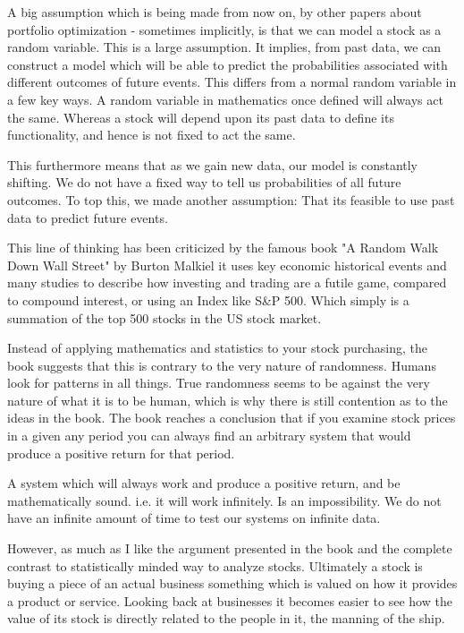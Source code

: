 \documentclass[11pt]{article}
\begin{document}
    A big assumption which is being made from now on, by other papers about portfolio optimization - sometimes implicitly,
    is that we can model a stock as a random variable. This is a large assumption. It
    implies, from past data, we can construct a model which will be able
    to predict the probabilities associated with different outcomes of future events.
    This differs from a normal random variable in a few key ways. A random variable in
    mathematics once defined will always act the same. Whereas a stock will
    depend upon its past data to define its functionality, and hence is not fixed to act
    the same.

    This furthermore means that as we gain new data, our model is constantly shifting.
    We do not have a fixed way to tell us probabilities of all future outcomes.
    To top this, we made another assumption: That its feasible to use past data to predict
    future events.

    This line of thinking has been criticized by the famous book "A Random Walk Down
    Wall Street" by Burton Malkiel \cite{BurtonMalkiel} it uses
    key economic historical events and many studies to describe how investing and trading are
    a futile game, compared to compound interest, or using an Index like S\&P 500. Which
    simply is a summation of the top 500 stocks in the US stock market.

    Instead of applying mathematics and statistics to your stock purchasing, the book
    suggests that this is contrary to the 
    very nature of randomness. Humans look for patterns in all things. True 
    randomness seems to be against the very nature of what it is to be human, which is why
    there is still contention as to the ideas in the book. The book reaches a conclusion that
    if you examine stock prices in a given any period you can always find an arbitrary
    system that would produce a positive return for that period.

    A system which will always work and produce a positive return, and be mathematically sound.
    i.e. it will work infinitely. Is an impossibility. We do not have an infinite amount of
    time to test our systems on infinite data.

    However, as much as I like the argument presented in the book and the complete contrast to
    statistically minded way to analyze stocks. Ultimately a stock is buying a piece of an
    actual business something which is valued on how it provides a product or service.
    Looking back at businesses it becomes easier to see how the value of its stock is directly
    related to the people in it, the manning of the ship.
\end{document}
